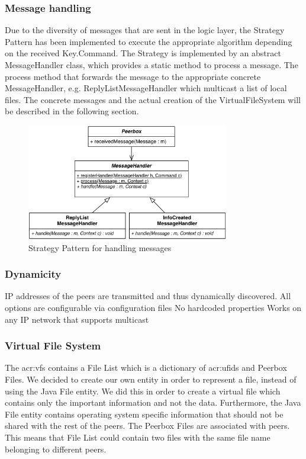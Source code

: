 \subsubsection{Message handling}
Due to the diversity of messages that are sent in the logic layer, the Strategy Pattern has been implemented to execute the appropriate algorithm depending on the received Key.Command. The Strategy is implemented by an abstract MessageHandler class, which provides a static method to process a message. The process method that forwards the message to the appropriate concrete MessageHandler, e.g. ReplyListMessageHandler which multicast a list of local files. The concrete messages and the actual creation of the VirtualFileSystem will be described in the following section. 

\begin{figure}[htbp]
\centering
\includegraphics[height=2in]{figures/mhStrategy.pdf}
\caption{Strategy Pattern for handling messages}
\label{fig:figures_mhStrategy}
\end{figure}

\subsubsection{Dynamicity}
IP addresses of the peers are transmitted and thus dynamically discovered.
All options are configurable via configuration files
No hardcoded properties
Works on any IP network that supports multicast


\subsubsection{Virtual File System}
    
The \gls{acr:vfs} contains a File List which is a dictionary of \glspl{acr:ufid} and Peerbox Files. We decided to create our own entity in order to represent a file, instead of using the Java File entity. We did this in order to create a virtual file which contains only the important information and not the data. Furthermore, the Java File entity contains operating system specific information that should not be shared with the rest of the peers. The Peerbox Files are associated with peers. This means that File List could contain two files with the same file name belonging to different peers.
    
